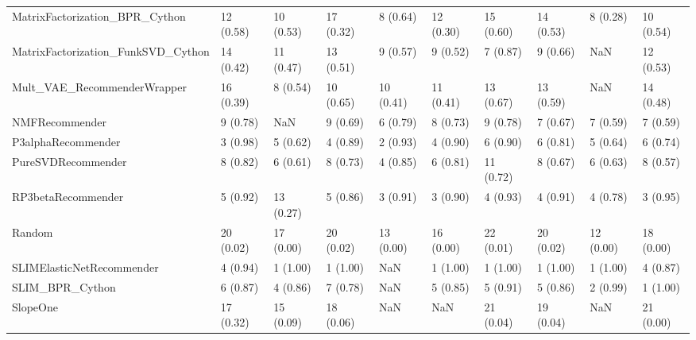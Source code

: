 \begin{tabular}{llllllllll}
     MatrixFactorization\_BPR\_Cython &                12 (0.58) &   10 (0.53) &     17 (0.32) &     8 (0.64) &            12 (0.30) &           15 (0.60) &         14 (0.53) &           8 (0.28) &         10 (0.54) \\
 MatrixFactorization\_FunkSVD\_Cython &                14 (0.42) &   11 (0.47) &     13 (0.51) &     9 (0.57) &             9 (0.52) &            7 (0.87) &          9 (0.66) &                NaN &         12 (0.53) \\
        Mult\_VAE\_RecommenderWrapper &                16 (0.39) &    8 (0.54) &     10 (0.65) &    10 (0.41) &            11 (0.41) &           13 (0.67) &         13 (0.59) &                NaN &         14 (0.48) \\
                     NMFRecommender &                 9 (0.78) &         NaN &      9 (0.69) &     6 (0.79) &             8 (0.73) &            9 (0.78) &          7 (0.67) &           7 (0.59) &          7 (0.59) \\
                 P3alphaRecommender &                 3 (0.98) &    5 (0.62) &      4 (0.89) &     2 (0.93) &             4 (0.90) &            6 (0.90) &          6 (0.81) &           5 (0.64) &          6 (0.74) \\
                 PureSVDRecommender &                 8 (0.82) &    6 (0.61) &      8 (0.73) &     4 (0.85) &             6 (0.81) &           11 (0.72) &          8 (0.67) &           6 (0.63) &          8 (0.57) \\
                 RP3betaRecommender &                 5 (0.92) &   13 (0.27) &      5 (0.86) &     3 (0.91) &             3 (0.90) &            4 (0.93) &          4 (0.91) &           4 (0.78) &          3 (0.95) \\
                             Random &                20 (0.02) &   17 (0.00) &     20 (0.02) &    13 (0.00) &            16 (0.00) &           22 (0.01) &         20 (0.02) &          12 (0.00) &         18 (0.00) \\
          SLIMElasticNetRecommender &                 4 (0.94) &    1 (1.00) &      1 (1.00) &          NaN &             1 (1.00) &            1 (1.00) &          1 (1.00) &           1 (1.00) &          4 (0.87) \\
                    SLIM\_BPR\_Cython &                 6 (0.87) &    4 (0.86) &      7 (0.78) &          NaN &             5 (0.85) &            5 (0.91) &          5 (0.86) &           2 (0.99) &          1 (1.00) \\
                           SlopeOne &                17 (0.32) &   15 (0.09) &     18 (0.06) &          NaN &                  NaN &           21 (0.04) &         19 (0.04) &                NaN &         21 (0.00) \\

\end{tabular}
